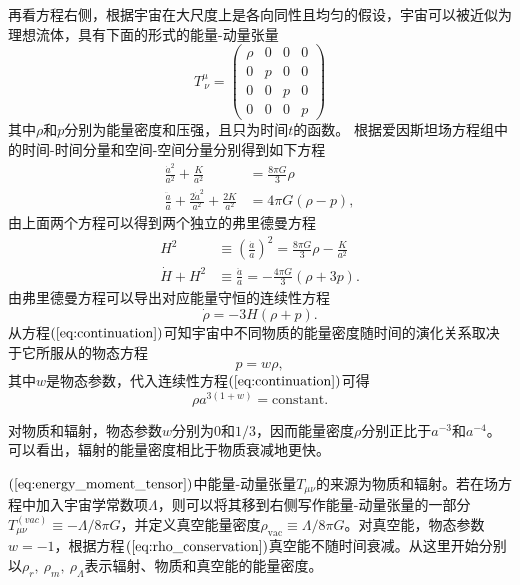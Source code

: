 再看方程右侧，根据宇宙在大尺度上是各向同性且均匀的假设，宇宙可以被近似为理想流体，具有下面的形式的能量-动量张量
\begin{equation}
    \label{eq:energy_moment_tensor}
    T^{\mu}_{\ \nu} =
    \begin{pmatrix}
        \rho & 0 & 0 & 0 \\
        0 & p & 0 & 0 \\
        0 & 0 & p & 0 \\
        0 & 0 & 0 & p
    \end{pmatrix}
\end{equation}
其中$\rho$和$p$分别为能量密度和压强，且只为时间$t$的函数。
根据爱因斯坦场方程组中的时间-时间分量和空间-空间分量分别得到如下方程
\begin{align}
    \label{eq:00_einstein} 
    \frac{\dot{a}^2}{a^2} + \frac{K}{a^2} &= \frac{8\pi G}{3} \rho \\
    \label{eq:ij_einstein}
    \frac{\ddot{a}}{a}+\frac{2\dot{a}^2}{a^2}+\frac{2K}{a^2}&= 4\pi G(\rho-p),
\end{align}
由上面两个方程可以得到两个独立的弗里德曼方程
\begin{align}
    \label{eq:1st_friedmann_equation}
    H^2 &\equiv {\left(\frac{\dot{a}}{a}\right)}^2 = \frac{8\pi G}{3} \rho -
    \frac{K}{a^2} \\
    \label{eq:accelaration_equation}
    \dot{H} + H^2 &\equiv \frac{\ddot{a}}{a} = -\frac{4\pi G}{3}\left(\rho +
    3p\right).
\end{align}
由弗里德曼方程可以导出对应能量守恒的连续性方程
\begin{equation}\label{eq:continuation}
    \dot{\rho}=-3H\left(\rho+p\right).
\end{equation}
从方程$(\ref{eq:continuation})$可知宇宙中不同物质的能量密度随时间的演化关系取决于它所服从的物态方程
\begin{equation}
    \label{eq:state_equation}
    p=w\rho,
\end{equation}
其中$w$是物态参数，代入连续性方程$(\ref{eq:continuation})$可得
\begin{equation}
    \label{eq:rho_conservation}
    \rho a^{3(1+w)} =\text{constant}.
\end{equation}

对物质和辐射，物态参数$w$分别为$0$和$1/3$，因而能量密度$\rho$分别正比于$a^{-3}$和$a^{-4}$。可以看出，辐射的能量密度相比于物质衰减地更快。

$(\ref{eq:energy_moment_tensor})$中能量-动量张量$T_{\mu\nu}$的来源为物质和辐射。若在场方程中加入宇宙学常数项$\Lambda$，则可以将其移到右侧写作能量-动量张量的一部分$T^{(vac)}_{\mu\nu}\equiv-\Lambda/{8\pi
G}$，并定义真空能量密度$\rho_{\text{vac}}\equiv\Lambda/{8\pi G}$。对真空能，物态参数$w=-1$，根据方程$(\ref{eq:rho_conservation})$真空能不随时间衰减。从这里开始分别以$\rho_r,\
\rho_m,\ \rho_{\Lambda}$表示辐射、物质和真空能的能量密度。

